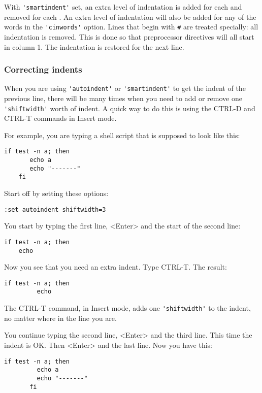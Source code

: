 With \verb!'smartindent'! set, an extra level of indentation is added for each { and removed for each }.
An extra level of indentation will also be added for any of the words in the \verb!'cinwords'! option.
Lines that begin with \verb!#! are treated specially: all indentation is removed.
This is done so that preprocessor directives will all start in column 1.
The indentation is restored for the next line.

\subsubsection{Correcting indents}
When you are using \verb!'autoindent'! or \verb!'smartindent'! to get the indent of the previous line, there will be many times when you need to add or remove one \verb!'shiftwidth'! worth of indent.
A quick way to do this is using the CTRL-D and CTRL-T commands in Insert mode.

For example, you are typing a shell script that is supposed to look like this:

\begin{Verbatim}[samepage=true]
    if test -n a; then 
       echo a 
       echo "-------" 
    fi 
\end{Verbatim}

Start off by setting these options:

\begin{Verbatim}[samepage=true]
 :set autoindent shiftwidth=3
\end{Verbatim}

You start by typing the first line, <Enter> and the start of the second line:

\begin{Verbatim}[samepage=true]
    if test -n a; then 
    echo 
\end{Verbatim}

Now you see that you need an extra indent.
Type CTRL-T.
The result:

\begin{Verbatim}[samepage=true]
    if test -n a; then 
         echo 
\end{Verbatim}

The CTRL-T command, in Insert mode, adds one \verb!'shiftwidth'! to the indent, no matter where in the line you are.

You continue typing the second line, <Enter> and the third line.
This time the indent is OK.
Then <Enter> and the last line.
Now you have this:

\begin{Verbatim}[samepage=true]
    if test -n a; then 
         echo a 
         echo "-------" 
       fi 
\end{Verbatim}

